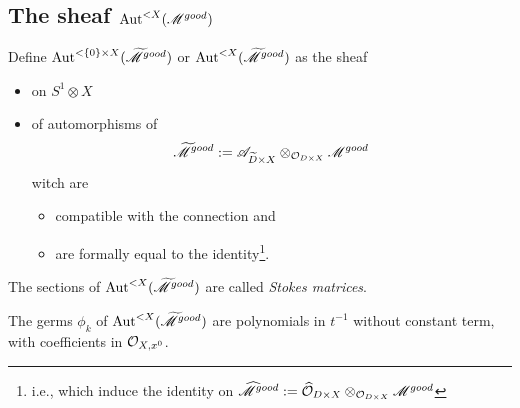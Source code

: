 \subsection{The sheaf $\operatorname{Aut}^{<X}(\mathscr{M}^{good})$}
\begin{defn}
  Define $\operatorname{Aut}^{<\{0\}\times X}(\widetilde{\mathscr{M}}^{good})$ or
  $\operatorname{Aut}^{<X}(\widetilde{\mathscr{M}}^{good})$ as the sheaf
  \begin{itemize}
    \item on $S^1\otimes X$
    \item of automorphisms of
      \[
        \widetilde{\mathscr{M}}^{good}
          :=\mathscr{A}_{\widetilde D\times X}\otimes_{\mathcal{O}_{D\times X}}\mathscr{M}^{good}
      \]
      witch are
      \begin{itemize}
        \item compatible with the connection and
        \item are formally equal to the identity\footnote{i.e., which
          induce the identity on $\widehat {\mathscr{M}}^{good}:=\widehat {\mathcal{O}}_{D\times
          X}\otimes_{\mathcal{O}_{D\times X}}\mathscr{M}^{good}$}.
      \end{itemize}
  \end{itemize}
  The sections of $\operatorname{Aut}^{<X}(\widetilde{\mathscr{M}}^{good})$ are called \emph{Stokes
  matrices}.
\end{defn}
The germs $\phi_k$ of $\operatorname{Aut}^{<X}(\widetilde{\mathscr{M}}^{good})$ are polynomials in $t^{-1}$
without constant term, with coefficients in $\mathcal{O}_{X,x^0}$.

